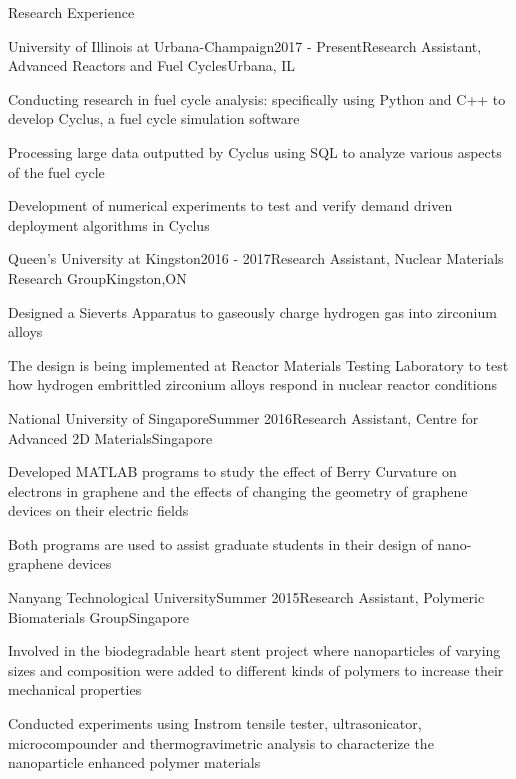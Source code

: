 \documentclass{resume2} %
\begin{document}
\begin{rSection}{Research Experience}

\begin{rSubsection}{University of Illinois at Urbana-Champaign}{2017 - Present}{Research Assistant, Advanced Reactors and Fuel Cycles}{Urbana, IL}
\item Conducting research in fuel cycle analysis: specifically using Python and C++ to develop Cyclus, a fuel cycle simulation software
\item Processing large data outputted by Cyclus using SQL to analyze various aspects of the fuel cycle 
\item Development of numerical experiments to test and verify demand driven deployment algorithms in Cyclus 
\end{rSubsection}

\begin{rSubsection}{Queen's University at Kingston}{2016 - 2017}{Research Assistant, Nuclear Materials Research Group}{Kingston,ON}
\item Designed a Sieverts Apparatus to gaseously charge hydrogen gas into zirconium alloys 
\item The design is being implemented at Reactor Materials Testing Laboratory to test how hydrogen embrittled zirconium alloys respond in nuclear reactor conditions
\iffalse
\item Application to nuclear industry: zirconium alloys used in nuclear reactors succumb to hydrogen embrittlement during its lifetime, therefore, it is important to be able to replicate the conditions in nuclear reactors, so as to study its end-of-life conditions
\fi
\end{rSubsection}

\begin{rSubsection}{National University of Singapore}{Summer 2016}{Research Assistant, Centre for Advanced 2D Materials}{Singapore}
	\item Developed MATLAB programs to study the effect of Berry Curvature on electrons in graphene and the effects of changing the geometry of graphene devices on their electric fields 
	\item Both programs are used to assist graduate students in their design of nano-graphene devices
\end{rSubsection}

	\begin{rSubsection}{Nanyang Technological University}{Summer 2015}{Research Assistant, Polymeric Biomaterials Group}{Singapore}
	\item Involved in the biodegradable heart stent project where nanoparticles of varying sizes and composition were added to different kinds of polymers to increase their mechanical properties
	\item Conducted experiments using Instrom tensile tester, ultrasonicator, microcompounder and thermogravimetric analysis to characterize the nanoparticle enhanced polymer materials
	\end{rSubsection}

\end{rSection}
\end{document}
